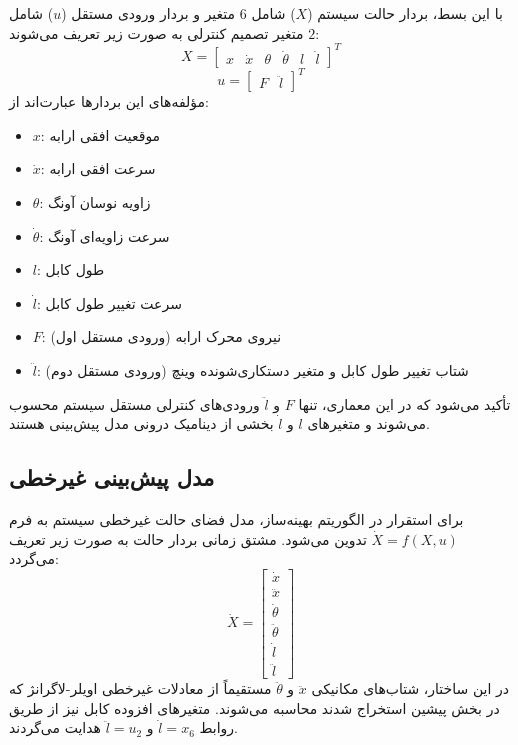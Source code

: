 با این بسط، بردار حالت سیستم ($X$) شامل $6$ متغیر و بردار ورودی مستقل ($u$) شامل $2$ متغیر تصمیم کنترلی به صورت زیر تعریف می‌شوند:
\begin{equation}
    X = \begin{bmatrix} x & \dot{x} & \theta & \dot{\theta} & l & \dot{l} \end{bmatrix}^T
\end{equation}
\begin{equation}
    u = \begin{bmatrix} F & \ddot{l} \end{bmatrix}^T
\end{equation}
مؤلفه‌های این بردارها عبارت‌اند از:
\begin{itemize}
    \item $x$: موقعیت افقی ارابه
    \item $\dot{x}$: سرعت افقی ارابه
    \item $\theta$: زاویه نوسان آونگ
    \item $\dot{\theta}$: سرعت زاویه‌ای آونگ
    \item $l$: طول کابل
    \item $\dot{l}$: سرعت تغییر طول کابل
    \item $F$: نیروی محرک ارابه (ورودی مستقل اول)
    \item $\ddot{l}$: شتاب تغییر طول کابل و متغیر دستکاری‌شونده وینچ (ورودی مستقل دوم)
\end{itemize}
تأکید می‌شود که در این معماری، تنها $F$ و $\ddot{l}$ ورودی‌های کنترلی مستقل سیستم محسوب می‌شوند و متغیرهای $l$ و $\dot{l}$ بخشی از دینامیک درونی مدل پیش‌بینی هستند.

\subsection{مدل پیش‌بینی غیرخطی}
برای استقرار در الگوریتم بهینه‌ساز، مدل فضای حالت غیرخطی سیستم به فرم $\dot{X} = f(X, u)$ تدوین می‌شود. مشتق زمانی بردار حالت به صورت زیر تعریف می‌گردد:
\begin{equation}
    \dot{X} =
    \begin{bmatrix}
        \dot{x}       \\
        \ddot{x}      \\
        \dot{\theta}  \\
        \ddot{\theta} \\
        \dot{l}       \\
        \ddot{l}
    \end{bmatrix}
\end{equation}
در این ساختار، شتاب‌های مکانیکی $\ddot{x}$ و $\ddot{\theta}$ مستقیماً از معادلات غیرخطی اویلر-لاگرانژ که در بخش پیشین استخراج شدند محاسبه می‌شوند. متغیرهای افزوده کابل نیز از طریق روابط $\dot{l} = x_6$ و $\ddot{l} = u_2$ هدایت می‌گردند.


